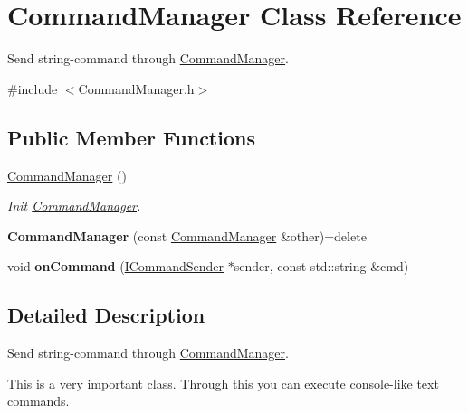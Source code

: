 \hypertarget{class_command_manager}{\section{Command\-Manager Class Reference}
\label{class_command_manager}
}


Send string-\/command through \hyperlink{class_command_manager}{Command\-Manager}.  




{\ttfamily \#include $<$Command\-Manager.\-h$>$}

\subsection*{Public Member Functions}
\begin{DoxyCompactItemize}
\item 
\hyperlink{class_command_manager_a8a13226bf933396a3f35dfb5bee3e813}{Command\-Manager} ()
\begin{DoxyCompactList}\small\item\em Init \hyperlink{class_command_manager}{Command\-Manager}. \end{DoxyCompactList}\item 
\hypertarget{class_command_manager_aeaffe7fa7dd8f1dd45b642120013a076}{{\bfseries Command\-Manager} (const \hyperlink{class_command_manager}{Command\-Manager} \&other)=delete}\label{class_command_manager_aeaffe7fa7dd8f1dd45b642120013a076}

\item 
\hypertarget{class_command_manager_abef8721bbe32e1ecb22f2f3d3b8c0601}{void {\bfseries on\-Command} (\hyperlink{class_i_command_sender}{I\-Command\-Sender} $\ast$sender, const std\-::string \&cmd)}\label{class_command_manager_abef8721bbe32e1ecb22f2f3d3b8c0601}

\end{DoxyCompactItemize}


\subsection{Detailed Description}
Send string-\/command through \hyperlink{class_command_manager}{Command\-Manager}. 

This is a very important class. Through this you can execute console-\/like text commands. 

